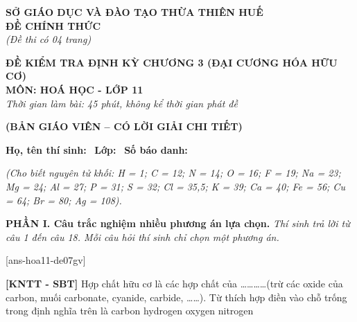 \documentclass[12pt,a4paper]{article}
\begin{document}
\thispagestyle{firstpage}

\noindent
\begin{minipage}[t]{0.44\textwidth}
	\centering\fontsize{10pt}{12pt}\selectfont
	\textbf{SỞ GIÁO DỤC VÀ ĐÀO TẠO THỪA THIÊN HUẾ}\\
	\textbf{ĐỀ CHÍNH THỨC}\\
	\textit{(Đề thi có 04 trang)}
\end{minipage}\hfill
\begin{minipage}[t]{0.54\textwidth}
	\centering\fontsize{10.5pt}{13pt}\selectfont
	\textbf{ĐỀ KIỂM TRA ĐỊNH KỲ CHƯƠNG 3 (ĐẠI CƯƠNG HÓA HỮU CƠ)}\\
	\textbf{MÔN: HOÁ HỌC - LỚP 11}\\
	\textit{Thời gian làm bài: 45 phút, không kể thời gian phát đề}
	
	\smallskip
\end{minipage}

\smallskip
\begin{center}
	{\color{hfRed}\textbf{\large (BẢN GIÁO VIÊN -- CÓ LỜI GIẢI CHI TIẾT)}}
\end{center}

\smallskip
\noindent\hrulefill
\smallskip

\noindent\textbf{Họ, tên thí sinh:} \dotfill\ \textbf{Lớp:} \dotfill\ \textbf{Số báo danh:} \dotfill

\smallskip
\noindent\textit{(Cho biết nguyên tử khối: H = 1; C = 12; N = 14; O = 16; F = 19; Na = 23; Mg = 24; Al = 27; P = 31; S = 32; Cl = 35,5; K = 39; Ca = 40; Fe = 56; Cu = 64; Br = 80; Ag = 108).}
\smallskip

\noindent\textbf{\large PHẦN I. Câu trắc nghiệm nhiều phương án lựa chọn.}
\textit{Thí sinh trả lời từ câu 1 đến câu 18. Mỗi câu hỏi thí sinh chỉ chọn một phương án.}
\vspace{0.2cm}

[ans-hoa11-de07gv]

\begin{ex}
\textbf{[KNTT - SBT]} Hợp chất hữu cơ là các hợp chất của \dots\dots\dots\dots (trừ các oxide của carbon, muối carbonate, cyanide, carbide, \dots\dots). Từ thích hợp điền vào chỗ trống trong định nghĩa trên là
\choice
{\True carbon}
{hydrogen}
{oxygen}
{nitrogen}

\end{ex}
\end{document}
